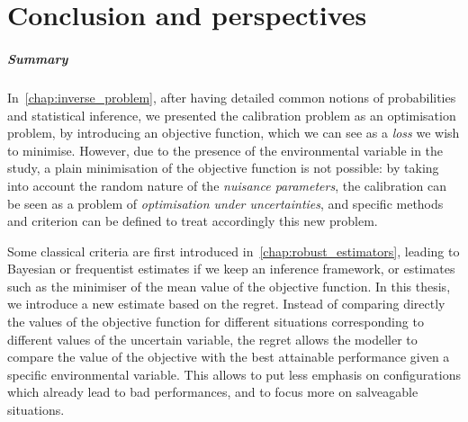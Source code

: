 \documentclass[../../Main_ManuscritThese.tex]{subfiles}
\begin{document}
\pagestyle{conclusionStyle}



\TitleBtwLines
\chapter*{Conclusion and perspectives}
{}
\label{chap:Conclusion}
\renewcommand{\thesection}{} %

\paragraph{Summary}
In~\cref{chap:inverse_problem}, after having detailed common notions
of probabilities and statistical inference, we presented the
calibration problem as an optimisation problem, by introducing an
objective function, which we can see as a \emph{loss} we wish to
minimise. However, due to the presence of the environmental variable
in the study, a plain minimisation of the objective function is not
possible: by taking into account the random nature of the
\emph{nuisance parameters}, the calibration can be seen as a problem
of \emph{optimisation under uncertainties}, and specific methods and
criterion can be defined to treat accordingly this new problem.


Some classical criteria are first introduced
in~\cref{chap:robust_estimators}, leading to Bayesian or frequentist
estimates if we keep an inference framework, or estimates such as the
minimiser of the mean value of the objective function. In this thesis,
we introduce a new estimate based on the regret. Instead of comparing
directly the values of the objective function for different situations
corresponding to different values of the uncertain variable, the
regret allows the modeller to compare the value of the objective with
the best attainable performance given a specific environmental
variable. This allows to put less emphasis on configurations which
already lead to bad performances, and to focus more on salveagable
situations.
\end{document}
